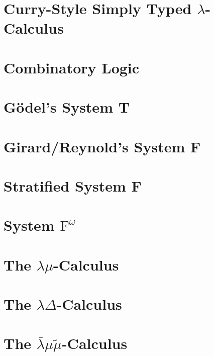 \documentclass[phd,appendix,dedicationpage,ackpage,epigraphpage]{uithesis}
\newcommand{\LBMMT}[0]{\bar{\lambda}\mu\tilde\mu}
\begin{document}
\newpage
\section{Curry-Style Simply Typed $\lambda$-Calculus}
\label{sec:curry_style_simply_typed_lambda-calculus}
\CSTLCall{}

\newpage
\section{Combinatory Logic}
\label{sec:combinatory_logic}
\Comball{}

\newpage
\section{G\"odel's System T}
\label{sec:godels_system_t}
\Tall{}

\newpage
\section{Girard/Reynold's System F}
\label{sec:girard-reynolds_system_f}
\Fall{}

\newpage
\section{Stratified System F}
\label{sec:stratified_system_f}
\SSFall{}

\newpage
\section{System $\text{F}^\omega$}
\label{sec:system_fw}
\Fwall{}

\newpage
\section{The $\lambda\mu$-Calculus}
\label{sec:lamu_all}
\Lamuall{}

\newpage
\section{The $\lambda\Delta$-Calculus}
\label{sec:lamd_all}
\Lamdall{}

\newpage
\section{The $\LBMMT$-Calculus}
\label{sec:lbmmt_all}
\LBMMTall{}
\end{document}
